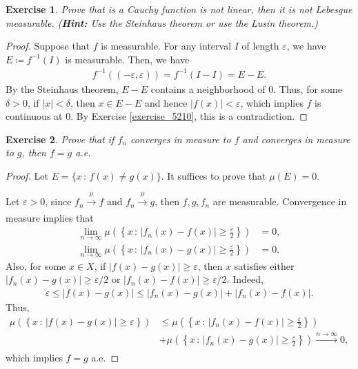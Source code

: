 \documentclass[11pt]{book}
\newtheorem{exercise}{Exercise}[section]
\theoremstyle{definition}
\numberwithin{equation}{chapter}
\begin{document}
\medskip

\begin{exercise}
Prove that is a Cauchy function is not linear, then it is not Lebesgue measurable. ({\bf Hint:} Use the Steinhaus theorem or use the Lusin theorem.)
\end{exercise}
\begin{proof}
Suppose that $f$ is measurable. For any interval $I$ of length $\varepsilon$, we have $E \coloneqq f^{-1}(I)$ is measurable. Then, we have
\begin{align*}
    f^{-1}((-\varepsilon,\varepsilon)) = f^{-1}(I - I) = E - E.
\end{align*}
By the Steinhaus theorem, $E - E$ contains a neighborhood of $0$. Thus, for some $\delta > 0$, if $\left|x\right| < \delta$, then $x \in E - E$ and hence $\left|f(x)\right| < \varepsilon$, which implies $f$ is continuous at $0$. By Exercise \ref{exercise_5210}, this is a contradiction.
\end{proof}

\medskip

\begin{exercise}\label{exercise_5213}
Prove that if $f_n$ converges in measure to $f$ and converges in measure to $g$, then $f = g$ a.e.
\end{exercise}
\begin{proof}
Let $E = \{x \,:\, f(x) \neq g(x)\}$. It suffices to prove that $\mu(E) = 0$. 

Let $\varepsilon > 0$, since $f_n \xrightarrow[]{\mu} f$ and $f_n \xrightarrow[]{\mu} g$, then $f,g,f_n$ are measurable. Convergence in measure implies that
\begin{align*}
    \lim_{n\to\infty} \mu\left(\left\{x \,:\, \left|f_n(x) - f(x)\right| \geq \frac{\varepsilon}{2}\right\}\right) & = 0, \\
    \lim_{n\to\infty} \mu\left(\left\{x \,:\, \left|f_n(x) - g(x)\right| \geq \frac{\varepsilon}{2}\right\}\right) & = 0.
\end{align*}
Also, for some $x \in X$, if $\left|f(x) - g(x)\right| \geq \varepsilon$, then $x$ satisfies either $\left|f_n(x) - g(x)\right| \geq \varepsilon/2$ or $\left|f_n(x) - f(x)\right| \geq \varepsilon/2$. Indeed, 
\begin{align*}
    \varepsilon \leq \left|f(x) - g(x)\right| \leq \left|f_n(x) - g(x)\right| + \left|f_n(x) - f(x)\right|.
\end{align*}
Thus,
\begin{align*}
    \mu\left(\left\{x \,:\, \left|f(x) - g(x)\right| \geq \varepsilon\right\}\right) & \leq \mu\left(\left\{x \,:\, \left|f_n(x) - f(x)\right| \geq \frac{\varepsilon}{2}\right\}\right) \\
    & + \mu\left(\left\{x \,:\, \left|f_n(x) - g(x)\right| \geq \frac{\varepsilon}{2}\right\}\right) \xrightarrow[]{n\to\infty} 0,
\end{align*}
which implies $f = g$ a.e.
\end{proof}
\end{document}
